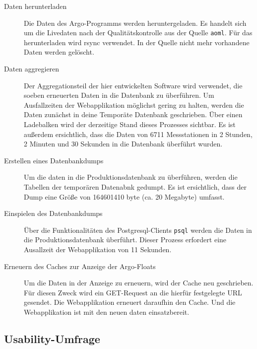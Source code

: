 \begin{description}
 \item [Daten herunterladen] 
    Die Daten des Argo-Programms werden heruntergeladen. Es handelt sich um die Livedaten nach der Qualitätskontrolle aus der Quelle \texttt{aoml}. Für das herunterladen wird rsync verwendet. In der Quelle nicht mehr vorhandene Daten werden gelöscht.
    
    
 \item [Daten aggregieren]
    Der Aggregationsteil der hier entwickelten Software wird verwendet, die soeben erneuerten Daten in die Datenbank zu überführen. Um Ausfallzeiten der Webapplikation möglichst gering zu halten, werden die Daten zunächst in deine Temporäte Datenbank geschrieben. Über einen Ladebalken wird der derzeitige Stand dieses Prozesses sichtbar. Es ist außerdem ersichtlich, dass die Daten von 6711 Messstationen in 2 Stunden, 2 Minuten und 30 Sekunden in die Datenbank überführt wurden.
    
 \item [Erstellen eines Datenbankdumps]
    Um die daten in die Produktionsdatenbank zu überführen, werden die Tabellen der temporären Datenabnk gedumpt. Es ist ersichtlich, dass der Dump eine Größe von  164601410 byte (ca. 20 Megabyte) umfasst.
    
 \item [Einspielen des Datenbankdumps]
    Über die Funktionalitäten des Postgresql-Clients \texttt{psql} werden die Daten in die Produktionsdatenbank überführt. Dieser Prozess erfordert eine Ausallzeit der Webapplikation von 11 Sekunden. 
    
 \item [Erneuern des Caches zur Anzeige der Argo-Floats]
    Um die Daten in der Anzeige zu erneuern, wird der Cache neu geschrieben. Für diesen Zweck wird ein GET-Request an die hierfür festgelegte URL gesendet. Die Webapplikation erneuert daraufhin den Cache. Und die Webapplikation ist mit den neuen daten einsatzbereit.
\end{description}



\newpage
\subsection{Usability-Umfrage}
